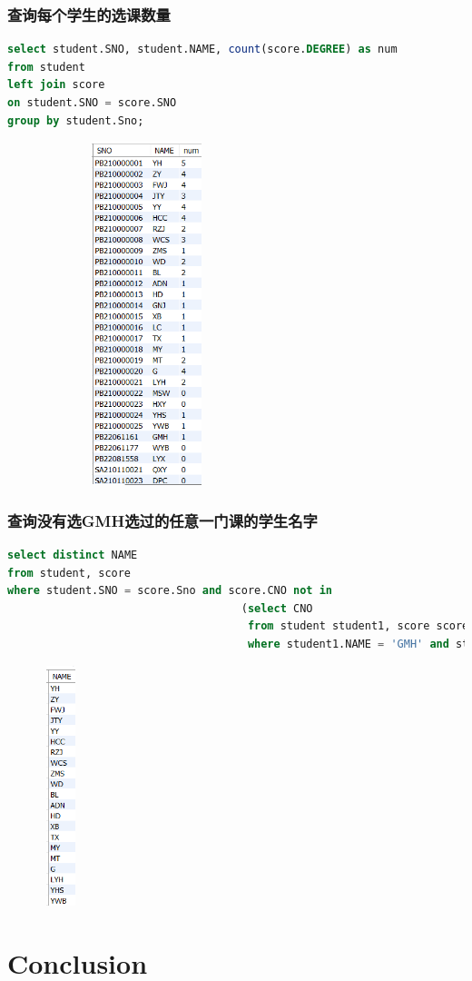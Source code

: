 \documentclass{ctexart}
\begin{document}
\subsubsection{查询每个学生的选课数量}
\begin{lstlisting}[language=sql]
select student.SNO, student.NAME, count(score.DEGREE) as num
from student
left join score
on student.SNO = score.SNO
group by student.Sno;
\end{lstlisting}
\begin{figure}[H]
	\centering 
	\includegraphics[height=10cm,width=6cm]{60.png}
	\end{figure}
\subsubsection{查询没有选GMH选过的任意一门课的学生名字}
\begin{lstlisting}[language=sql]
select distinct NAME  
from student, score 
where student.SNO = score.Sno and score.CNO not in
									(select CNO
									 from student student1, score score1
									 where student1.NAME = 'GMH' and student1.Sno = score1.Sno);
\end{lstlisting}
\begin{figure}[H]
	\centering 
	\includegraphics[height=7cm,width=1cm]{61.png}
	\end{figure}
	\section{Conclusion}
    
\end{document}
